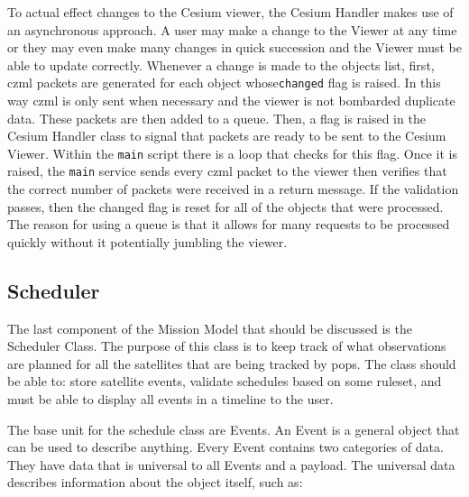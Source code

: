 To actual effect changes to the Cesium viewer, the Cesium Handler makes use of
an asynchronous approach. A user may make a change to the Viewer at any time or
they may even make many changes in quick succession and the Viewer must be able
to update correctly. Whenever a change is made to the objects list, first,
\gls{czml} packets are generated for each object whose\texttt{changed} flag is
raised. In this way czml is only sent when necessary and the viewer is not
bombarded duplicate data. These packets are then added to a queue. Then, a flag
is raised in the Cesium Handler class to signal that packets are ready to be
sent to the Cesium Viewer. Within the \texttt{main} script there is a loop that
checks for this flag. Once it is raised, the \texttt{main} service sends every
\gls{czml} packet to the viewer then verifies that the correct number of
packets were received in a return message. If the validation passes, then the
changed flag is reset for all of the objects that were processed. The reason
for using a queue is that it allows for many requests to be processed quickly
without it potentially jumbling the viewer.


\subsection{Scheduler}

The last component of the Mission Model that should be discussed is the
Scheduler Class. The purpose of this class is to keep track of what
observations are planned for all the satellites that are being tracked by
\gls{pops}. The class should be able to: store satellite events, validate
schedules based on some ruleset, and must be able to display all events in a
timeline to the user. 

The base unit for the schedule class are Events. An Event is a general object
that can be used to describe anything. Every Event contains two categories of
data. They have data that is universal to all Events and a payload. The
universal data describes information about the object itself, such as:


